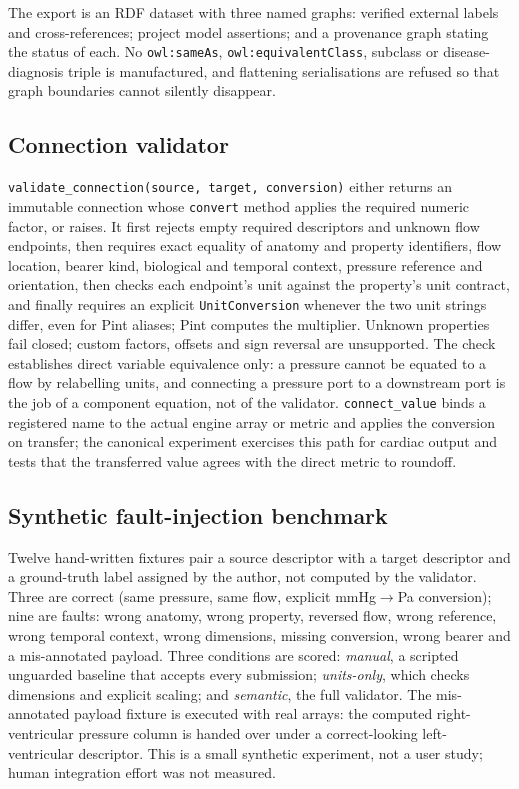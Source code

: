 \documentclass[11pt,letterpaper]{article}
\newcommand{\pkg}[1]{\texttt{#1}}
\begin{document}
The export is an RDF dataset with three named graphs: verified external labels and cross-references; project model assertions; and a provenance graph stating the status of each. No \pkg{owl:sameAs}, \pkg{owl:equivalentClass}, subclass or disease-diagnosis triple is manufactured, and flattening serialisations are refused so that graph boundaries cannot silently disappear.

\subsection{Connection validator}

\pkg{validate\_connection(source, target, conversion)} either returns an immutable connection whose \pkg{convert} method applies the required numeric factor, or raises. It first rejects empty required descriptors and unknown flow endpoints, then requires exact equality of anatomy and property identifiers, flow location, bearer kind, biological and temporal context, pressure reference and orientation, then checks each endpoint's unit against the property's unit contract, and finally requires an explicit \pkg{UnitConversion} whenever the two unit strings differ, even for Pint aliases; Pint computes the multiplier. Unknown properties fail closed; custom factors, offsets and sign reversal are unsupported. The check establishes direct variable equivalence only: a pressure cannot be equated to a flow by relabelling units, and connecting a pressure port to a downstream port is the job of a component equation, not of the validator. \pkg{connect\_value} binds a registered name to the actual engine array or metric and applies the conversion on transfer; the canonical experiment exercises this path for cardiac output and tests that the transferred value agrees with the direct metric to roundoff.

\subsection{Synthetic fault-injection benchmark}

Twelve hand-written fixtures pair a source descriptor with a target descriptor and a ground-truth label assigned by the author, not computed by the validator. Three are correct (same pressure, same flow, explicit mmHg$\to$Pa conversion); nine are faults: wrong anatomy, wrong property, reversed flow, wrong reference, wrong temporal context, wrong dimensions, missing conversion, wrong bearer and a mis-annotated payload. Three conditions are scored: \emph{manual}, a scripted unguarded baseline that accepts every submission; \emph{units-only}, which checks dimensions and explicit scaling; and \emph{semantic}, the full validator. The mis-annotated payload fixture is executed with real arrays: the computed right-ventricular pressure column is handed over under a correct-looking left-ventricular descriptor. This is a small synthetic experiment, not a user study; human integration effort was not measured.
\end{document}
